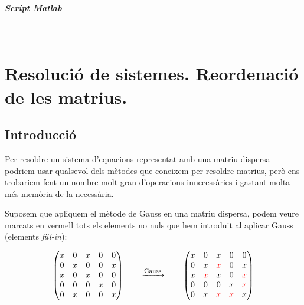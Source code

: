 \documentclass[11pt,a4paper,twoside]{report}
\begin{document}
 \paragraph*{Script Matlab} \mbox{} \\


\chapter{Resolució de sistemes. Reordenació de les matrius.}

\section{Introducció}

Per resoldre un sistema d'equacions representat amb una matriu dispersa podriem usar qualsevol dels mètodes que coneixem per resoldre matrius, però ens trobariem fent un nombre molt gran d'operacions innecessàries i gastant molta més memòria de la necessària. \newline

Suposem que apliquem el mètode de Gauss en una matriu dispersa, podem veure marcats en vermell tots els elements no nuls que hem introduit al aplicar Gauss (elements \textit{fill-in}):

\[
\begin{pmatrix}
  	x & 0 & x & 0 & 0\\
  	0 & x & 0 & 0 & x\\
  	x & 0 & x & 0 & 0\\
  	0 & 0 & 0 & x & 0\\
  	0 & x & 0 & 0 & x\\
\end{pmatrix} \qquad \xrightarrow{\text{Gauss}} \qquad
\begin{pmatrix}
  	x & 0 & x & 0 & 0\\
  	0 & x & \textcolor{red}{x} & 0 & x\\
  	x & \textcolor{red}{x} & x & 0 & \textcolor{red}{x}\\
  	0 & 0 & 0 & x & \textcolor{red}{x}\\
  	0 & x & \textcolor{red}{x} & \textcolor{red}{x} & x\\
\end{pmatrix}
\]

\end{document}
